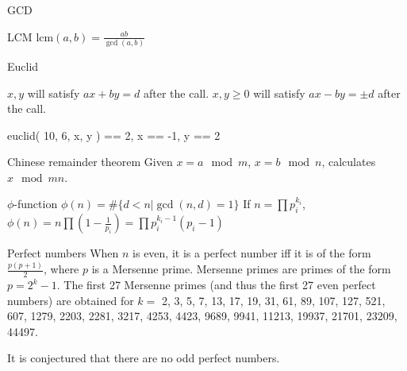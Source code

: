 \categorycontents{}



\begin{algorithm}{GCD}


\end{algorithm}

\def\lcm{\mathrm{lcm}}
\begin{algorithm}{LCM}
\desc $\lcm(a,b)=\frac{ab}{\gcd(a,b)}$
\end{algorithm}

\begin{algorithm}{Euclid}

\desc
$x, y$ will satisfy $ax+by=d$ after the call.
\desc
$x, y\ge 0$ will satisfy $ax-by=\pm d$ after the call.
\begin{example}
	euclid( 10, 6, x, y ) == 2, x == -1, y == 2
\end{example}
\end{algorithm}

\begin{algorithm}{Chinese remainder theorem}
\desc
Given $x=a\mod m$, $x=b\mod n$, calculates $x\mod mn$.
\end{algorithm}

\begin{algorithm}{$\phi$-function}
\desc $\phi(n)=\#\{d<n|\gcd(n,d)=1\}$
\desc If $n=\prod p_i^{k_i}$,
$\phi(n)=n\prod\left(1-\frac{1}{p_i}\right)=\prod p_i^{k_i-1}(p_i-1)$
\end{algorithm}

\begin{algorithm}{Perfect numbers}
\desc
When $n$ is even, it is a perfect number iff it is of the form
$\frac{p (p+1)}{2}$, where $p$ is a Mersenne prime. Mersenne primes are primes
of the form $p = 2^k - 1$. The first 27 Mersenne primes (and thus the first 27
even perfect numbers) are obtained for $k =$ 2, 3, 5, 7, 13, 17, 19, 31, 61,
89, 107, 127, 521, 607, 1279, 2203, 2281, 3217, 4253, 4423, 9689, 9941, 11213,
19937, 21701, 23209, 44497.

It is conjectured that there are no odd perfect numbers.
\end{algorithm}

